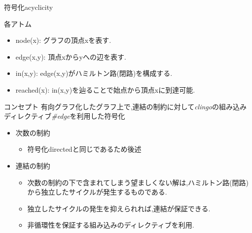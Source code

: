 \documentclass[dvipdfmx,11pt]{beamer}
\begin{document}
\begin{frame}[noframenumbering]{符号化acyclicity}
  \begin{block}{各アトム}
    \begin{itemize}
    \item \small{\alert{node(x)}: グラフの頂点xを表す.}
    \item \small{\alert{edge(x,y)}: 頂点xからyへの辺を表す.}
    \item \small{\alert{in(x,y)}: edge(x,y)がハミルトン路(閉路)を構成する.}
    \item \small{\alert{reached(x)}: in(x,y)を辿ることで始点から頂点xに到達可能.}
    \end{itemize}
  \end{block}
  \begin{alertblock}{コンセプト}
    有向グラフ化したグラフ上で,連結の制約に対して\textit{clingo}の組み込みディレクティブ\textit{\#edge}を利用した符号化
  \end{alertblock}
  \begin{itemize}
  \item \alert{次数の制約}
    \begin{itemize}
    \item 符号化directedと同じであるため後述
    \end{itemize}
  \item \alert{連結の制約}
    \begin{itemize}
    \item 次数の制約の下で含まれてしまう望ましくない解は,ハミルトン路(閉路)から独立したサイクルが発生するものである.
    \item 独立したサイクルの発生を抑えられれば,連結が保証できる.
    \item 非循環性を保証する組み込みのディレクティブ\textit{}を利用.
    \end{itemize}
  \end{itemize}
\end{frame}
\end{document}
